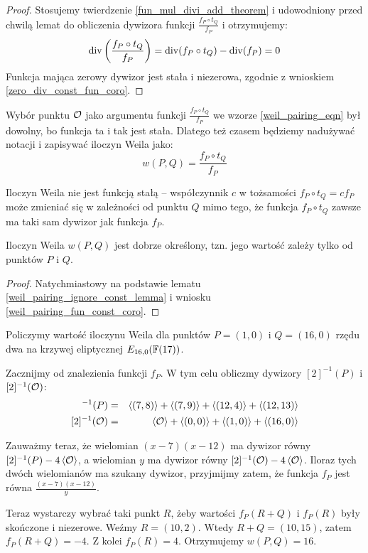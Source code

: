 \begin{proof}
Stosujemy twierdzenie \ref{fun_mul_divi_add_theorem}
i udowodniony przed chwilą lemat
do obliczenia dywizora funkcji $\frac{f_P \circ t_Q}{f_P}$
i otrzymujemy:
\begin{equation*}
\operatorname{div}\left(\frac{f_P \circ t_Q}{f_P}\right) =
\operatorname{div}(f_P \circ t_Q) - \operatorname{div}(f_P) = 0
\end{equation*}
Funkcja mająca zerowy dywizor jest stała i niezerowa,
zgodnie z wnioskiem \ref{zero_div_const_fun_coro}.
\end{proof}

\begin{remark}
Wybór punktu $\mathcal{O}$ jako argumentu funkcji $\frac{f_P \circ t_Q}{f_P}$
we wzorze \ref{weil_pairing_eqn} był dowolny,
bo funkcja ta i tak jest stała.
Dlatego też czasem będziemy nadużywać notacji i zapisywać
iloczyn Weila jako:
\begin{equation*}
w(P, Q) = \frac{f_P \circ t_Q}{f_P}
\end{equation*}
\end{remark}

\begin{remark}
Iloczyn Weila nie jest funkcją stałą --
współczynnik $c$ w tożsamości $f_P \circ t_Q = cf_P$
może zmieniać się w zależności od punktu $Q$ mimo tego,
że funkcja $f_P \circ t_Q$ zawsze ma taki sam dywizor jak funkcja $f_P$.
\end{remark}

\begin{theorem}
Iloczyn Weila $w(P, Q)$ jest dobrze określony,
tzn. jego wartość zależy tylko od punktów $P$ i $Q$.
\end{theorem}

\begin{proof}
Natychmiastowy na podstawie
lematu \ref{weil_pairing_ignore_const_lemma}
i wniosku \ref{weil_pairing_fun_const_coro}.
\end{proof}

\begin{example}
Policzymy wartość iloczynu Weila
dla punktów $P = (1, 0)$ i $Q = (16, 0)$ rzędu dwa
na krzywej eliptycznej $E_{16,0}(\mathbb{F}(17))$.

\noindent
Zacznijmy od znalezienia funkcji $f_P$.
W tym celu obliczmy dywizory $[2]^{-1}(P)$ i $[2]^{-1}(\mathcal{O})$:
\begin{eqnarray*}
[2]^{-1}(P) 
& = &
\divi{(7, 8)} + \divi{(7, 9)} + \divi{(12, 4)} + \divi{(12, 13)}
\\{}
[2]^{-1}(\ecident)
& = &
\divi{\ecident} + \divi{(0, 0)} + \divi{(1, 0)} + \divi{(16, 0)}
\end{eqnarray*}

\noindent
Zauważmy teraz,
że wielomian $(x - 7)(x - 12)$
ma dywizor równy $[2]^{-1}(P) - 4\left\langle\mathcal{O}\right\rangle$,
a wielomian $y$ ma dywizor równy
$[2]^{-1}(\mathcal{O}) - 4\left\langle\mathcal{O}\right\rangle$.
Iloraz tych dwóch wielomianów ma szukany dywizor,
przyjmijmy zatem, że funkcja $f_P$ jest równa $\frac{(x - 7)(x - 12)}{y}$.

\noindent
Teraz wystarczy wybrać taki punkt $R$,
żeby wartości $f_P(R + Q)$ i $f_P(R)$ były skończone i niezerowe.
Weźmy $R = (10, 2)$.
Wtedy $R + Q = (10, 15)$, zatem $f_P(R + Q) = -4$.
Z kolei $f_P(R) = 4$.
Otrzymujemy $w(P, Q) = 16$.
\end{example}
